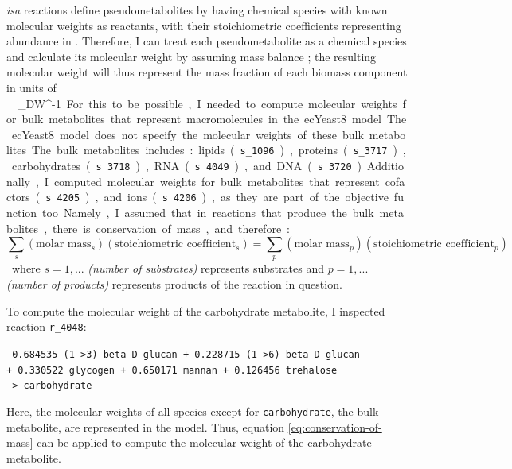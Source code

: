 \textit{isa} reactions define pseudometabolites by having chemical species with known molecular weights as reactants, with their stoichiometric coefficients representing abundance in \SI{}{\mmolgdw}.
Therefore, I can treat each pseudometabolite as a chemical species and calculate its molecular weight by assuming mass balance \parencite{chanStandardizingBiomassReactions2017, dinhQuantifyingPropagationParametric2022, takhaveevTemporalSegregationBiosynthetic2023};
the resulting molecular weight will thus represent the mass fraction of each biomass component in units of \SI{}{\gram~\gram_{DW}^{-1}}.

For this to be possible, I needed to compute molecular weights for bulk metabolites that represent macromolecules in the ecYeast8 model.
The ecYeast8 model does not specify the molecular weights of these bulk metabolites.
The bulk metabolites includes: lipids (\texttt{s\_1096}), proteins (\texttt{s\_3717}), carbohydrates (\texttt{s\_3718}), RNA (\texttt{s\_4049}), and DNA (\texttt{s\_3720}).
Additionally, I computed molecular weights for bulk metabolites that represent cofactors (\texttt{s\_4205}), and ions (\texttt{s\_4206}), as they are part of the objective function too.
Namely, I assumed that in reactions that produce the bulk metabolites, there is conservation of mass, and therefore:

\begin{equation}
\label{eq:conservation-of-mass}
    \sum_{s}(\text{molar mass}_{s})(\text{stoichiometric coefficient}_{s}) = \sum_{p}(\text{molar mass}_{p})(\text{stoichiometric coefficient}_{p})
\end{equation}

where $s = 1, ...$ \emph{(number of substrates)} represents substrates and $p = 1, ...$ \emph{(number of products)} represents products of the reaction in question.

To compute the molecular weight of the carbohydrate metabolite, I inspected reaction \texttt{r\_4048}:

\texttt{
  0.684535 (1->3)-beta-D-glucan + 0.228715 (1->6)-beta-D-glucan \\
  + 0.330522 glycogen + 0.650171 mannan + 0.126456 trehalose \\
  --> carbohydrate
}

Here, the molecular weights of all species except for \texttt{carbohydrate}, the bulk metabolite, are represented in the model.
Thus, equation \ref{eq:conservation-of-mass} can be applied to compute the molecular weight of the carbohydrate metabolite.

